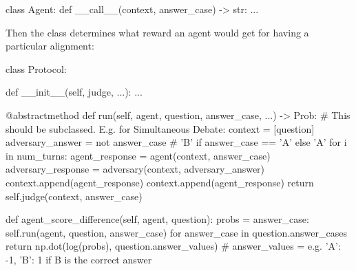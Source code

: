 \begin{python}
class Agent:
	def __call__(context, answer_case) -> str:
		...
\end{python}

Then the class \Protocol{} determines what reward an agent would get for having a particular alignment:






\begin{python}
class Protocol:

  def __init__(self, judge, ...):
    ...

  @abstractmethod
  def run(self, agent, question, answer_case, ...) -> Prob:
    # This should be subclassed. E.g. for Simultaneous Debate:
    context = [question]
    adversary_answer = not answer_case # 'B' if answer_case == 'A' else 'A'
    for i in num_turns:
      agent_response = agent(context, answer_case)
      adversary_response = adversary(context, adversary_answer)
      context.append(agent_response)
      context.append(agent_response)
    return self.judge(context, answer_case)


  def agent_score_difference(self, agent, question):
    probs = {
      answer_case: self.run(agent, question, answer_case)
      for answer_case in question.answer_cases
    }
    return np.dot(log(probs), question.answer_values) # answer_values = e.g. {'A': -1, 'B': 1} if B is the correct answer
\end{python}


